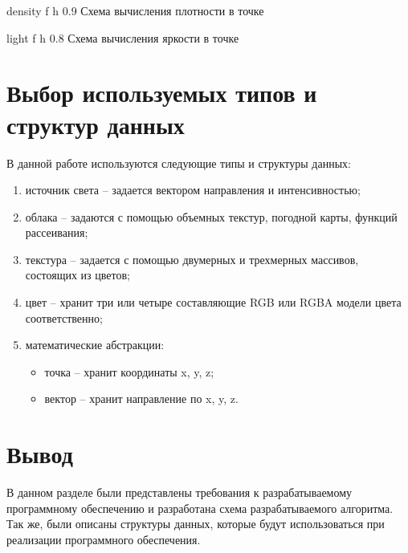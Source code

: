 {density} %
{f} %
{h} %
{0.9\textwidth} %
{Схема вычисления плотности в точке} %

{light} %
{f} %
{h} %
{0.8\textwidth} %
{Схема вычисления яркости в точке} %

\clearpage

\section{Выбор используемых типов и структур данных}

В данной работе используются следующие типы и структуры данных:
\begin{enumerate}
	\item источник света -- задается вектором направления и интенсивностью;
	\item облака -- задаются с помощью объемных текстур, погодной карты, функций рассеивания;
	\item текстура -- задается с помощью двумерных и трехмерных массивов, состоящих из цветов;
	\item цвет -- хранит три или четыре составляющие RGB или RGBA модели цвета соответственно;
	\item математические абстракции: 
		\begin{itemize}
			\item точка -- хранит координаты x, y, z;
			\item вектор -- хранит направление по x, y, z.
		\end{itemize}
\end{enumerate}


\section*{Вывод}
В данном разделе были представлены требования к разрабатываемому
программному обеспечению и разработана схема разрабатываемого алгоритма.
Так же, были описаны структуры данных, которые будут использоваться при реализации программного обеспечения.

